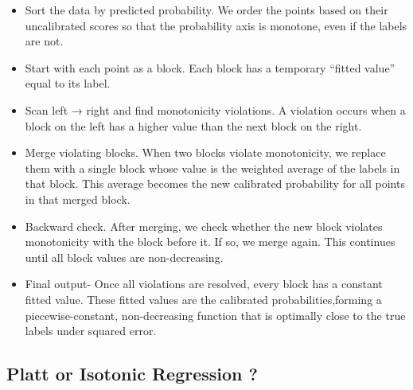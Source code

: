 \documentclass[10pt,a4paper]{article}
\begin{document}
	\begin{itemize}
		\item Sort the data by predicted probability. We order the points based on their uncalibrated scores so that the probability axis is monotone, even if the labels are not.
		\item Start with each point as a block. Each block has a temporary “fitted value” equal to its label.
		\item Scan left → right and find monotonicity violations. A violation occurs when a block on the left has a higher value than the next block on the right.
		\item Merge violating blocks. When two blocks violate monotonicity, we replace them with a single block whose value is the weighted average of the labels in that block. This average becomes the new calibrated probability for all points in that merged block.
		\item Backward check. After merging, we check whether the new block violates monotonicity with the block before it. If so, we merge again. This continues until all block values are non-decreasing.
		\item Final output- Once all violations are resolved, every block has a constant fitted value. These fitted values are the calibrated probabilities,forming a piecewise-constant, non-decreasing function that is optimally close to the true labels under squared error.
	\end{itemize}


	\subsection{Platt or Isotonic Regression ?}
\end{document}

